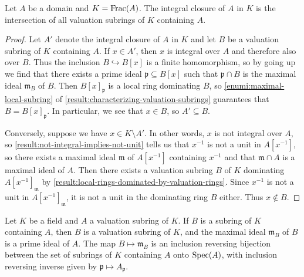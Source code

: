 \begin{lemma}
\label{result:integral-closure-intersection-of-valuation-rings}
Let $A$ be a domain and $K = \operatorname{Frac}(A)$. The integral closure of $A$ in $K$ is the intersection of all valuation subrings of $K$ containing $A$. 
\end{lemma}

\begin{proof}
Let $A'$ denote the integral closure of $A$ in $K$ and let $B$ be a valuation subring of $K$ containing $A$. If $x \in A'$, then $x$ is integral over $A$ and therefore also over $B$. Thus the inclusion $B \hookrightarrow B[x]$ is a finite homomorphism, so by going up  we find that there exists a prime ideal $\mathfrak{p} \subseteq B[x]$ such that $\mathfrak{p} \cap B$ is the maximal ideal $\mathfrak{m}_B$ of $B$. Then $B[x]_{\mathfrak{p}}$ is a local ring dominating $B$, so \cref{enumi:maximal-local-subring} of \cref{result:characterizing-valuation-subrings} guarantees that $B = B[x]_{\mathfrak{p}}$. In particular, we see that $x \in B$, so $A' \subseteq B$. 

Conversely, suppose we have $x \in K \setminus A'$. In other words, $x$ is not integral over $A$, so \cref{result:not-integral-implies-not-unit} tells us that $x^{-1}$ is not a unit in $A[x^{-1}]$, so there exists a maximal ideal $\mathfrak{m}$ of $A[x^{-1}]$ containing $x^{-1}$ and that $\mathfrak{m} \cap A$ is a maximal ideal of $A$. Then there exists a valuation subring $B$ of $K$ dominating $A[x^{-1}]_{\mathfrak{m}}$ by \cref{result:local-rings-dominated-by-valuation-rings}. Since $x^{-1}$ is not a unit in $A[x^{-1}]_{\mathfrak{m}}$, it is not a unit in the dominating ring $B$ either. Thus $x \notin B$. 
\end{proof}

\begin{lemma}
\label{result:overrings-and-prime-ideals}
Let $K$ be a field and $A$ a valuation subring of $K$. If $B$ is a subring of $K$ containing $A$, then $B$ is a valuation subring of $K$, and the maximal ideal $\mathfrak{m}_B$ of $B$ is a prime ideal of $A$. The map $B \mapsto \mathfrak{m}_B$ is an inclusion reversing bijection between the set of subrings of $K$ containing $A$ onto $\operatorname{Spec}(A)$, with inclusion reversing inverse given by $\mathfrak{p} \mapsto A_{\mathfrak{p}}$.
\end{lemma}

